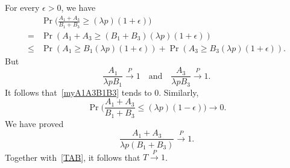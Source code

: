 \documentclass[review]{elsarticle}
\theoremstyle{plain}
\theoremstyle{definition}
\theoremstyle{remark}
\begin{document}
For every $\epsilon>0$, we have
\begin{equation}\label{myA1A3B1B3}
    \begin{aligned}
        &\Pr\Big(\frac{A_1+A_3}{B_1+B_3}\geq (\lambda p)(1+\epsilon)\Big)\\
        =&\Pr({A_1+A_3}\geq ({B_1+B_3})(\lambda p)(1+\epsilon))\\
        \leq&\Pr(A_1\geq B_1(\lambda p)(1+\epsilon))+
        \Pr(A_3\geq B_3(\lambda p)(1+\epsilon)).
    \end{aligned}
\end{equation}
But
\begin{equation*}
    \frac{A_1}{\lambda p B_1}\xrightarrow{P}1\quad \textrm{and}\quad 
    \frac{A_3}{\lambda p B_3}\xrightarrow{P}1.
\end{equation*}
It follows that~\eqref{myA1A3B1B3} tends to $0$. Similarly,
\begin{equation*}
        \Pr\Big(\frac{A_1+A_3}{B_1+B_3}\leq (\lambda p)(1-\epsilon)\Big)\to 0.
\end{equation*}
We have proved
\begin{equation}\label{largeNumberAB}
    \frac{A_1+A_3}{\lambda p(B_1+B_3)}\xrightarrow{P} 1.
\end{equation}
Together with~\eqref{TAB}, it follows that $T\xrightarrow{P} 1$.



\end{document}
